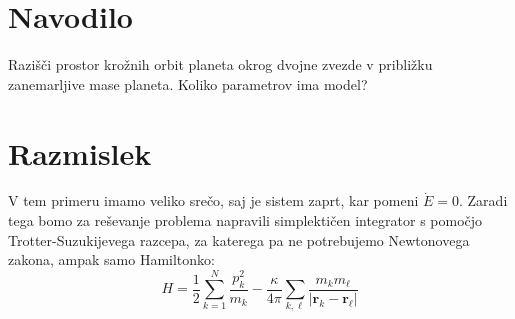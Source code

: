 \documentclass[12pt, a4paper]{article}
\renewcommand{\r}{
    \ensuremath{\mathbf{r}}
}
\begin{document}
\section{Navodilo}

Razi\v s\v ci prostor kro\v znih orbit planeta okrog dvojne zvezde v pribli\v zku zanemarljive mase
planeta. Koliko parametrov ima model?

\section{Razmislek}

V tem primeru imamo veliko sre\v co, saj je sistem zaprt, kar pomeni $\dot{E} = 0$. Zaradi tega bomo
za re\v sevanje problema napravili simplekti\v cen integrator s pomo\v cjo Trotter-Suzukijevega
razcepa, za katerega pa ne potrebujemo Newtonovega zakona, ampak samo Hamiltonko:
\[
    H = \frac{1}{2}\sum_{k = 1}^N \frac{p_k^2}{m_k} - \frac{\kappa}{4\pi}\sum_{k,\ell}
        \frac{m_k m_\ell}{|\r_k - \r_\ell|}
\]
\end{document}
